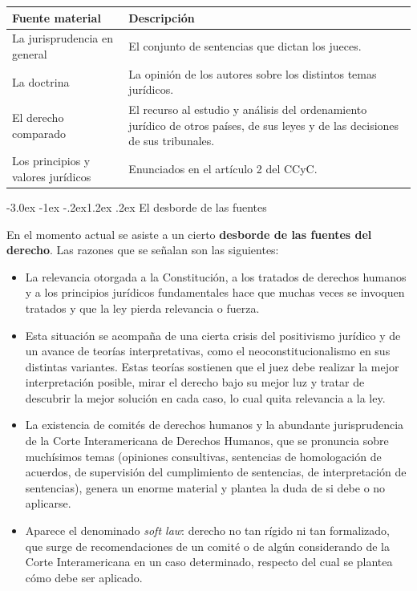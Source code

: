 \documentclass[12pt,oneside]{book}
\makeatletter
\renewcommand\section{\@startsection{section}{1}{\z@}%
  {-3.0ex \@plus -1ex \@minus -.2ex}{1.2ex \@plus .2ex}%
  {\normalfont\large\bfseries\color{acento}}}
\makeatother
\begin{document}
\begin{table}[H]
\centering
\begin{tabularx}{\textwidth}{>{\raggedright\arraybackslash}p{} >{\raggedright\arraybackslash}X}
\toprule
\textbf{Fuente material} & \textbf{Descripción} \\
\midrule
La jurisprudencia en general & El conjunto de sentencias que dictan los jueces. \\
\addlinespace
La doctrina & La opinión de los autores sobre los distintos temas jurídicos. \\
\addlinespace
El derecho comparado & El recurso al estudio y análisis del ordenamiento jurídico de otros países, de sus leyes y de las decisiones de sus tribunales. \\
\addlinespace
Los principios y valores jurídicos & Enunciados en el artículo 2 del CCyC. \\
\bottomrule
\end{tabularx}
\end{table}

\section{El desborde de las fuentes}

En el momento actual se asiste a un cierto \textbf{desborde de las fuentes del derecho}. Las razones que se señalan son las siguientes:

\begin{itemize}
    \item La relevancia otorgada a la Constitución, a los tratados de derechos humanos y a los principios jurídicos fundamentales hace que muchas veces se invoquen tratados y que la ley pierda relevancia o fuerza.
    \item Esta situación se acompaña de una cierta crisis del positivismo jurídico y de un avance de teorías interpretativas, como el neoconstitucionalismo en sus distintas variantes. Estas teorías sostienen que el juez debe realizar la mejor interpretación posible, mirar el derecho bajo su mejor luz y tratar de descubrir la mejor solución en cada caso, lo cual quita relevancia a la ley.
    \item La existencia de comités de derechos humanos y la abundante jurisprudencia de la Corte Interamericana de Derechos Humanos, que se pronuncia sobre muchísimos temas (opiniones consultivas, sentencias de homologación de acuerdos, de supervisión del cumplimiento de sentencias, de interpretación de sentencias), genera un enorme material y plantea la duda de si debe o no aplicarse.
    \item Aparece el denominado \textit{soft law}: derecho no tan rígido ni tan formalizado, que surge de recomendaciones de un comité o de algún considerando de la Corte Interamericana en un caso determinado, respecto del cual se plantea cómo debe ser aplicado.
\end{itemize}
\end{document}
